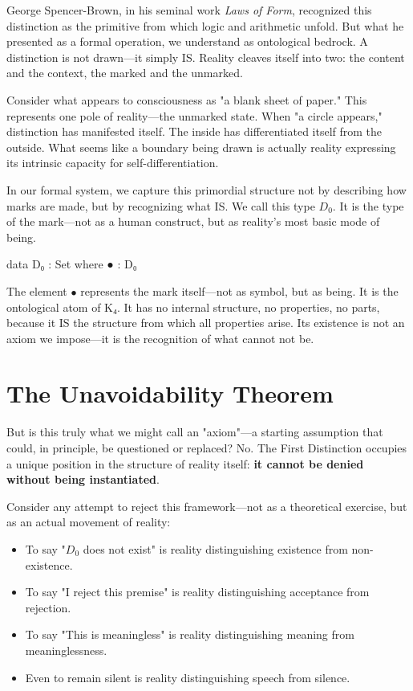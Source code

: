 \documentclass[11pt,a4paper]{book}
\begin{document}
George Spencer-Brown, in his seminal work \textit{Laws of Form}, recognized this distinction as the primitive from which logic and arithmetic unfold. But what he presented as a formal operation, we understand as ontological bedrock. A distinction is not drawn—it simply IS. Reality cleaves itself into two: the content and the context, the marked and the unmarked.

Consider what appears to consciousness as "a blank sheet of paper." This represents one pole of reality—the unmarked state. When "a circle appears," distinction has manifested itself. The inside has differentiated itself from the outside. What seems like a boundary being drawn is actually reality expressing its intrinsic capacity for self-differentiation.

In our formal system, we capture this primordial structure not by describing how marks are made, but by recognizing what IS. We call this type $D_0$. It is the type of the mark—not as a human construct, but as reality's most basic mode of being.

\begin{code}
data D₀ : Set where
  ● : D₀
\end{code}

The element $\bullet$ represents the mark itself—not as symbol, but as being. It is the ontological atom of K₄. It has no internal structure, no properties, no parts, because it IS the structure from which all properties arise. Its existence is not an axiom we impose—it is the recognition of what cannot not be.

\section{The Unavoidability Theorem}

But is this truly what we might call an "axiom"—a starting assumption that could, in principle, be questioned or replaced? No. The First Distinction occupies a unique position in the structure of reality itself: \textbf{it cannot be denied without being instantiated}.

Consider any attempt to reject this framework—not as a theoretical exercise, but as an actual movement of reality:
\begin{itemize}
\item To say "$D_0$ does not exist" is reality distinguishing existence from non-existence.
\item To say "I reject this premise" is reality distinguishing acceptance from rejection.
\item To say "This is meaningless" is reality distinguishing meaning from meaninglessness.
\item Even to remain silent is reality distinguishing speech from silence.
\end{itemize}
\end{document}
